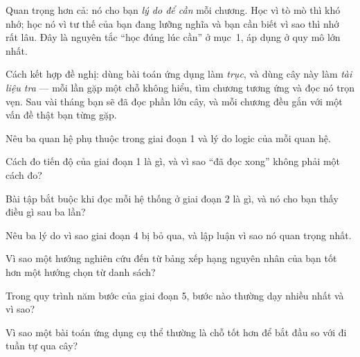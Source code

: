 \documentclass[../../vslam.tex]{subfiles}
\begin{document}
Quan trọng hơn cả: nó cho bạn \emph{lý do để cần} mỗi chương. Học  vì tò mò thì khó nhớ; học nó vì tư thế của bạn đang lưỡng nghĩa và bạn cần biết vì sao thì nhớ rất lâu. Đây là nguyên tắc ``học đúng lúc cần'' ở mục~1, áp dụng ở quy mô lớn nhất.

Cách kết hợp đề nghị: dùng bài toán ứng dụng làm \emph{trục}, và dùng cây này làm \emph{tài liệu tra} --- mỗi lần gặp một chỗ không hiểu, tìm chương tương ứng và đọc nó trọn vẹn. Sau vài tháng bạn sẽ đã đọc phần lớn cây, và mỗi chương đều gắn với một vấn đề thật bạn từng gặp.

\begin{tukiem}
\item Nêu ba quan hệ phụ thuộc trong giai đoạn 1 và lý do logic của mỗi quan hệ.
\item Cách đo tiến độ của giai đoạn 1 là gì, và vì sao ``đã đọc xong'' không phải một cách đo?
\item Bài tập bắt buộc khi đọc mỗi hệ thống ở giai đoạn 2 là gì, và nó cho bạn thấy điều gì sau ba lần?
\item Nêu ba lý do vì sao giai đoạn 4 bị bỏ qua, và lập luận vì sao nó quan trọng nhất.
\item Vì sao một hướng nghiên cứu đến từ bảng xếp hạng nguyên nhân của bạn tốt hơn một hướng chọn từ danh sách?
\item Trong quy trình năm bước của giai đoạn 5, bước nào thường dạy nhiều nhất và vì sao?
\item Vì sao một bài toán ứng dụng cụ thể thường là chỗ tốt hơn để bắt đầu so với đi tuần tự qua cây?
\end{tukiem}
\ifSubfilesClassLoaded{\printbibliography[title={Nguồn}]}{}
\end{document}
